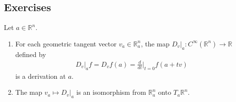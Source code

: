 \subsection{Exercises}
\begin{customthm}{3.2}
  Let $a \in \mathbb{R}^n$.
  \begin{enumerate}[label=(\alph*)]
    \item 
      For each geometric tangent vector $v_a \in \mathbb{R}^n_a$, the map $D_v\vert_a:C^{\infty}(\mathbb{R}^n) \rightarrow \mathbb{R}$ defined by
      \begin{align*}
        D_v\vert_a f = D_vf(a) = \frac{d}{dt}\Big\vert_{t = 0} f(a + tv)
      \end{align*}
      is a derivation at $a$.
    \item
      The map $v_a \mapsto D_v\vert_a$ is an isomorphism from $\mathbb{R}^n_a$ onto $T_a\mathbb{R}^n$.
  \end{enumerate}
\end{customthm}

